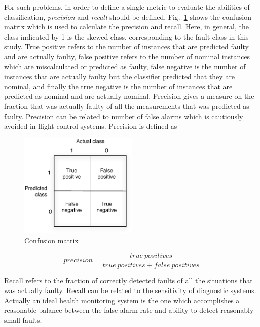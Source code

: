For such problems, in order to define a single metric to evaluate the abilities of classification, \emph{precision} and \emph{recall} should be defined.   
Fig.~\ref{fig:confusionMatrix} shows the confusion matrix which is used to calculate the precision and recall. 
Here, in general, the class indicated by 1 is the skewed class, corresponding to the fault class in this study. 
True positive refers to the number of instances that are predicted faulty and are actually faulty, false positive refers to the number of nominal instances which are miscalculated or predicted as faulty, false negative is the number of instances that are actually faulty but the classifier predicted that they are nominal, and finally the true negative is the number of instances that are predicted as nominal and are actually nominal.
Precision gives a measure on the fraction that was actually faulty of all the measurements that was predicted as faulty. 
Precision can be related to number of false alarms which is cautiously avoided in flight control systems. Precision is defined as 

\begin{figure}
\begin{center}
\includegraphics[width=0.5\textwidth]{figures/confusionMatrix}    %
\caption{Confusion matrix} 
\label{fig:confusionMatrix}
\end{center}
\end{figure}


\begin{equation}
precision = \frac{true \ positives}{true \ positives + false \ positives}
\end{equation}

Recall refers to the fraction of correctly detected faults of all the situations that was actually faulty. 
Recall can be related to the sensitivity of diagnostic systems. 
Actually an ideal health monitoring system is the one which accomplishes a reasonable balance between the false alarm rate and ability to detect reasonably small faults. 

